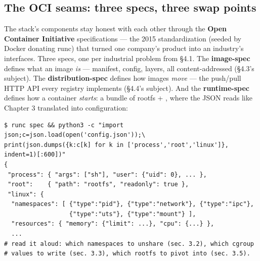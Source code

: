 \subsection*{The OCI seams: three specs, three swap points}

The stack's components stay honest with each other through the \textbf{Open Container Initiative} specifications — the 2015 standardization (seeded by Docker donating runc) that turned one company's product into an industry's interfaces. Three specs, one per industrial problem from §4.1. The \textbf{image-spec} defines what an image \textit{is} — manifest, config, layers, all content-addressed (§4.3's subject). The \textbf{distribution-spec} defines how images \textit{move} — the push/pull HTTP API every registry implements (§4.4's subject). And the \textbf{runtime-spec} defines how a container \textit{starts}: a bundle of rootfs + , where the JSON reads like Chapter 3 translated into configuration:

\begin{terminalbox}
\begin{Verbatim}[breaklines=true,breakanywhere=true,fontsize=\small,formatcom=\color{tbbtermfg},codes=\tbbcodeactive]
$ runc spec && python3 -c "import json;c=json.load(open('config.json'));\
print(json.dumps({k:c[k] for k in ['process','root','linux']}, indent=1)[:600])"
{
 "process": { "args": ["sh"], "user": {"uid": 0}, ... },
 "root":    { "path": "rootfs", "readonly": true },
 "linux": {
  "namespaces": [ {"type":"pid"}, {"type":"network"}, {"type":"ipc"},
                  {"type":"uts"}, {"type":"mount"} ],
  "resources": { "memory": {"limit": ...}, "cpu": {...} },
  ...
# read it aloud: which namespaces to unshare (sec. 3.2), which cgroup
# values to write (sec. 3.3), which rootfs to pivot into (sec. 3.5).
\end{Verbatim}
\end{terminalbox}

